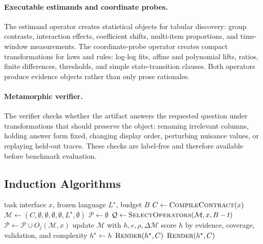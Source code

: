 \documentclass[letterpaper]{article}
\begin{document}
\paragraph{Executable estimands and coordinate probes.}
The estimand operator creates statistical objects for tabular discovery:
group contrasts, interaction effects, coefficient shifts, multi-item
proportions, and time-window measurements. The coordinate-probe operator
creates compact transformations for laws and rules: log-log fits, affine and
polynomial lifts, ratios, finite differences, thresholds, and simple
state-transition clauses. Both operators produce evidence objects rather than
only prose rationales.

\paragraph{Metamorphic verifier.}
The verifier checks whether the artifact answers the requested question under
transformations that should preserve the object: renaming irrelevant columns,
holding answer form fixed, changing display order, perturbing nuisance values,
or replaying held-out traces. These checks are label-free and therefore
available before benchmark evaluation.

\subsection{Induction Algorithms}

\begin{algorithm}[t]
\caption{Per-task executable search in a frozen hypothesis language}
\label{alg:per_task_search}
\begin{algorithmic}[1]
\REQUIRE task interface $x$, frozen language $L^\star$, budget $B$
\STATE $C \leftarrow \textsc{CompileContract}(x)$
\STATE $\mathcal{M}\leftarrow(C,\emptyset,\emptyset,\emptyset,\emptyset,L^\star,\emptyset)$
  \STATE $\mathcal{P}\leftarrow\emptyset$
  \STATE $\mathcal{Q}\leftarrow\textsc{SelectOperators}(\mathcal{M},x,B-t)$
    \STATE $\mathcal{P}\leftarrow\mathcal{P}\cup O_j(\mathcal{M},x)$
  \ENDFOR
    \STATE update $\mathcal{M}$ with $h,e,\rho,\Delta\mathcal{M}$
    \STATE score $h$ by evidence, coverage, validation, and complexity
       \STATE $h^\star \leftarrow h$
    \ENDIF
  \ENDFOR
     \RETURN $\textsc{Render}(h^\star,C)$
  \ENDIF
\ENDFOR
\RETURN $\textsc{Render}(h^\star,C)$
\end{algorithmic}
\end{algorithm}
\end{document}
